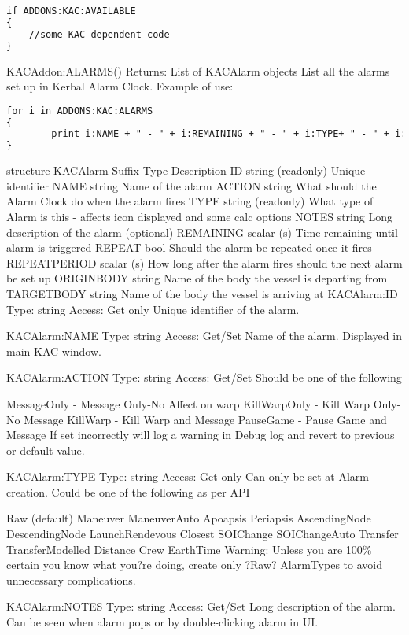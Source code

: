 \begin{lstlisting}[frame=single,language=XML]
if ADDONS:KAC:AVAILABLE
{
    //some KAC dependent code
}
\end{lstlisting}

KACAddon:ALARMS()
Returns:	List of KACAlarm objects
List all the alarms set up in Kerbal Alarm Clock. Example of use:

\begin{lstlisting}[frame=single,language=XML]
for i in ADDONS:KAC:ALARMS
{
        print i:NAME + " - " + i:REMAINING + " - " + i:TYPE+ " - " + i:ACTION.
}
\end{lstlisting}

structure KACAlarm
Suffix	Type	Description
ID	string (readonly)	Unique identifier
NAME	string	Name of the alarm
ACTION	string	What should the Alarm Clock do when the alarm fires
TYPE	string (readonly)	What type of Alarm is this - affects icon displayed and some calc options
NOTES	string	Long description of the alarm (optional)
REMAINING	scalar (s)	Time remaining until alarm is triggered
REPEAT	bool	Should the alarm be repeated once it fires
REPEATPERIOD	scalar (s)	How long after the alarm fires should the next alarm be set up
ORIGINBODY	string	Name of the body the vessel is departing from
TARGETBODY	string	Name of the body the vessel is arriving at
KACAlarm:ID
Type:	string
Access:	Get only
Unique identifier of the alarm.

KACAlarm:NAME
Type:	string
Access:	Get/Set
Name of the alarm. Displayed in main KAC window.

KACAlarm:ACTION
Type:	string
Access:	Get/Set
Should be one of the following

MessageOnly - Message Only-No Affect on warp
KillWarpOnly - Kill Warp Only-No Message
KillWarp - Kill Warp and Message
PauseGame - Pause Game and Message
If set incorrectly will log a warning in Debug log and revert to previous or default value.

KACAlarm:TYPE
Type:	string
Access:	Get only
Can only be set at Alarm creation. Could be one of the following as per API

Raw (default)
Maneuver
ManeuverAuto
Apoapsis
Periapsis
AscendingNode
DescendingNode
LaunchRendevous
Closest
SOIChange
SOIChangeAuto
Transfer
TransferModelled
Distance
Crew
EarthTime
Warning: Unless you are 100\% certain you know what you?re doing, create only ?Raw? AlarmTypes to avoid unnecessary complications.

KACAlarm:NOTES
Type:	string
Access:	Get/Set
Long description of the alarm. Can be seen when alarm pops or by double-clicking alarm in UI.

